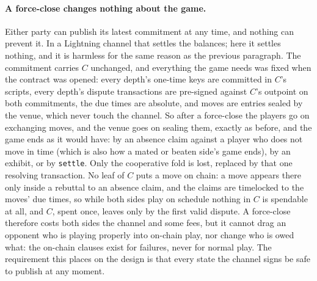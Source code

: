 \documentclass[11pt]{article}
\begin{document}
\paragraph{A force-close changes nothing about the game.} Either party
can publish its latest commitment at any time, and nothing can prevent
it. In a Lightning channel that settles the balances; here it settles
nothing, and it is harmless for the same reason as the previous
paragraph. The commitment carries $C$ unchanged, and everything the game
needs was fixed when the contract was opened: every depth's one-time
keys are committed in $C$'s scripts, every depth's dispute transactions
are pre-signed against $C$'s outpoint on both commitments, the due times
are absolute, and moves are entries sealed by the venue, which never
touch the channel. So after a force-close the players go on exchanging
moves, and the venue goes on sealing them, exactly as before, and the
game ends as it would have: by an absence claim against a player who
does not move in time (which is also how a mated or beaten side's game
ends), by an exhibit, or by \texttt{settle}. Only the cooperative fold
is lost, replaced by that one resolving transaction. No leaf of $C$ puts
a move on chain: a move appears there only inside a rebuttal to an
absence claim, and the claims are timelocked to the moves' due times,
so while both sides play on schedule nothing in $C$ is spendable at
all, and $C$, spent once, leaves only by the first valid dispute. A
force-close therefore costs both sides the channel and some fees, but
it cannot drag an opponent who is playing properly into on-chain play,
nor change who is owed what: the on-chain clauses exist for failures,
never for normal play. The requirement this places on the design is
that every state the channel signs be safe to publish at any moment.
\end{document}
